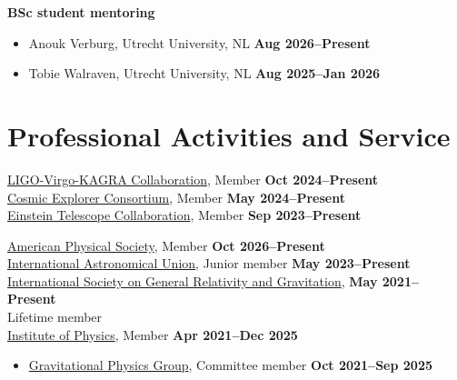 \begin{resume}
\textbf{BSc student mentoring}
%
\begin{itemize}[nosep]
    \item[] Anouk Verburg, Utrecht University, NL
    \hfill \textbf{Aug 2026--Present}
    \item[] Tobie Walraven, Utrecht University, NL
    \hfill \textbf{Aug 2025--Jan 2026}
\end{itemize}

\section{Professional Activities and Service}

\href{https://www.ligo.caltech.edu/page/ligo-scientific-collaboration}
{LIGO-Virgo-KAGRA Collaboration}, Member
\hfill \textbf{Oct 2024--Present} \\
%
%
\href{https://cosmicexplorer.org/}{Cosmic Explorer Consortium}, Member
\hfill \textbf{May 2024--Present} \\
%
\href{https://einsteintelescope.eu/}{Einstein Telescope Collaboration}, Member
\hfill \textbf{Sep 2023--Present}%

\href{https://www.aps.org/}{American Physical Society}, Member
\hfill \textbf{Oct 2026--Present} \\
%
\href{https://www.iau.org/}{International Astronomical Union}, Junior member
\hfill \textbf{May 2023--Present} \\
%
\href{http://www.isgrg.org/}
{International Society on General Relativity and Gravitation},
\hfill \textbf{May 2021--Present} \\
Lifetime member \\
%
%
\href{https://www.iop.org/}{Institute of Physics}, Member
\hfill \textbf{Apr 2021--Dec 2025}%
\begin{itemize}
    \item[]
    \href{https://www.iop.org/physics-community/special-interest-groups/gravitational-physics-group}
    {Gravitational Physics Group}, Committee member
    \hfill \textbf{Oct 2021--Sep 2025}
\end{itemize}



\end{resume}

